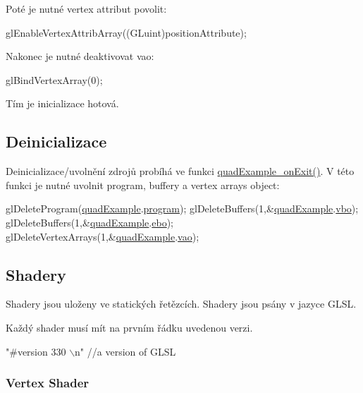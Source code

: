  Poté je nutné vertex attribut povolit\-: 
\begin{DoxyCodeInclude}
  glEnableVertexAttribArray((GLuint)positionAttribute);
\end{DoxyCodeInclude}
Nakonec je nutné deaktivovat vao\-: 
\begin{DoxyCodeInclude}
  glBindVertexArray(0);
\end{DoxyCodeInclude}
Tím je inicializace hotová. \hypertarget{quadExample.c_Deinit}{}\subsection{Deinicializace}\label{quadExample.c_Deinit}
Deinicializace/uvolnění zdrojů probíhá ve funkci \hyperlink{quadExample_8c_a19bc4ebaa15f60078724033bde27d8b9}{quad\-Example\-\_\-on\-Exit()}. V této funkci je nutné uvolnit program, buffery a vertex arrays object\-: 
\begin{DoxyCodeInclude}
  glDeleteProgram(\hyperlink{quadExample_8c_ad961415145a9c30bd9846d4a278cc63a}{quadExample}.\hyperlink{structQuadExampleVariables_a63971781ff860bd201886926f943ba78}{program});
  glDeleteBuffers(1,&\hyperlink{quadExample_8c_ad961415145a9c30bd9846d4a278cc63a}{quadExample}.\hyperlink{structQuadExampleVariables_a69515fd546272c117e14f784221f6412}{vbo});
  glDeleteBuffers(1,&\hyperlink{quadExample_8c_ad961415145a9c30bd9846d4a278cc63a}{quadExample}.\hyperlink{structQuadExampleVariables_a3b1abdb0f18593a0ebec8dd9a222164b}{ebo});
  glDeleteVertexArrays(1,&\hyperlink{quadExample_8c_ad961415145a9c30bd9846d4a278cc63a}{quadExample}.\hyperlink{structQuadExampleVariables_a294c388653d62435d7eeb7994f45c4fc}{vao});
\end{DoxyCodeInclude}
\hypertarget{quadExample.c_Shaders}{}\subsection{Shadery}\label{quadExample.c_Shaders}
Shadery jsou uloženy ve statických řetězcích. Shadery jsou psány v jazyce G\-L\-S\-L.\par
 Každý shader musí mít na prvním řádku uvedenou verzi. 
\begin{DoxyCodeInclude}
\textcolor{stringliteral}{"#version 330                                                   \(\backslash\)n"} \textcolor{comment}{//a version of GLSL}
\end{DoxyCodeInclude}
\hypertarget{quadExample.c_VertexShader}{}\subsubsection{Vertex Shader}\label{quadExample.c_VertexShader}

